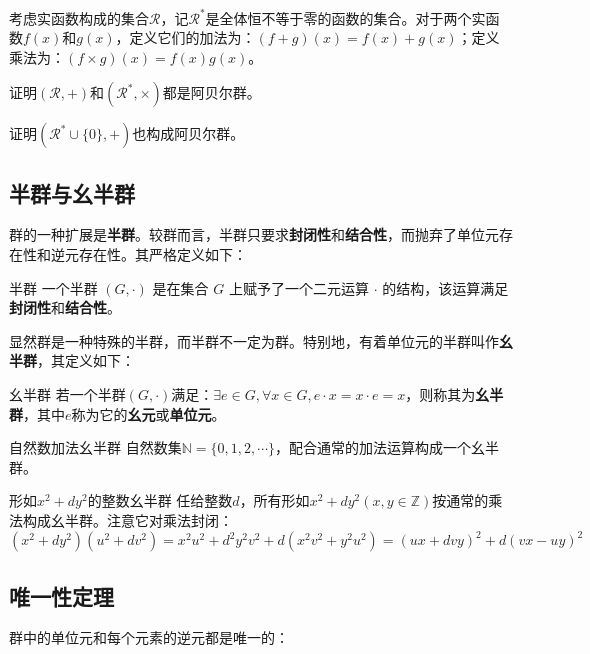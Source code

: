 \begin{exercise}{}
考虑实函数构成的集合$\mathcal{R}$，记$\mathcal{R}^*$是全体恒不等于零的函数的集合。对于两个实函数$f(x)$和$g(x)$，定义它们的加法为：$(f+g)(x)=f(x)+g(x)$；定义乘法为：$(f\times g)(x)=f(x) g(x)$。

证明$(\mathcal{R}, +)$和$(\mathcal{R}^*,\times )$都是阿贝尔群。

证明$(\mathcal{R}^*\cup \{0\}, +)$也构成阿贝尔群。
\end{exercise}

\subsection{半群与幺半群}

群的一种扩展是\textbf{半群}。较群而言，半群只要求\textbf{封闭性}和\textbf{结合性}，而抛弃了单位元存在性和逆元存在性。其严格定义如下：

\begin{definition}{半群}
一个半群 $(G, \cdot)$ 是在集合 $G$ 上赋予了一个二元运算 $\cdot$ 的结构，该运算满足\textbf{封闭性}和\textbf{结合性}。
\end{definition}

显然群是一种特殊的半群，而半群不一定为群。特别地，有着单位元的半群叫作\textbf{幺半群}，其定义如下：

\begin{definition}{幺半群}
若一个半群$(G,\cdot )$满足：$\exists e\in G,\forall x\in G,e\cdot x=x\cdot e=x$，则称其为\textbf{幺半群}，其中$e$称为它的\textbf{幺元}或\textbf{单位元}。
\end{definition}

\begin{example}{自然数加法幺半群}
自然数集$\mathbb N=\{0,1,2,\cdots \}$，配合通常的加法运算构成一个幺半群。
\end{example}

\begin{example}{形如$x^2+dy^2$的整数幺半群}
任给整数$d$，所有形如$x^2+dy^2(x,y\in \mathbb Z)$按通常的乘法构成幺半群。注意它对乘法封闭：
$$(x^2+dy^2)(u^2+dv^2)=x^2u^2+d^2y^2v^2+d(x^2v^2+y^2u^2)=(ux+dvy)^2+d(vx-uy)^2$$
\end{example}




\subsection{唯一性定理}

群中的单位元和每个元素的逆元都是唯一的：

